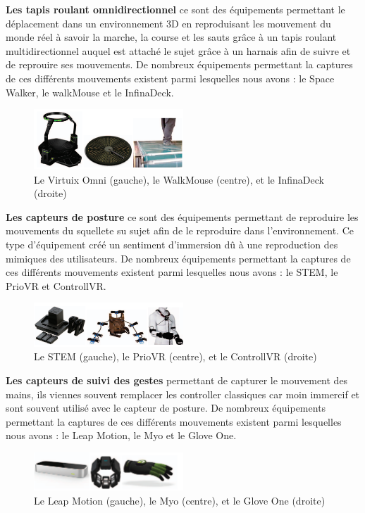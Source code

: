 \textbf{Les tapis roulant omnidirectionnel} ce sont des équipements permettant le déplacement dans un environnement 3D en reproduisant les mouvement du monde réel à savoir la marche, la course et les sauts grâce à un tapis roulant multidirectionnel auquel est attaché le sujet grâce à un harnais afin de suivre et de reprouire ses mouvements.
De nombreux équipements permettant la captures de ces différents mouvements existent parmi lesquelles nous avons : le Space Walker, le walkMouse et le InfinaDeck.

\begin{figure}[H]
	\centering
	\includegraphics[width=0.5\textwidth]{img/3dtap}
	\caption{Le Virtuix Omni (gauche), le WalkMouse (centre), et le InfinaDeck (droite)}
\end{figure}

\textbf{Les capteurs de posture} ce sont des équipements permettant de reproduire les mouvements du squellete su sujet afin de le reproduire dans l'environnement. Ce type d'équipement créé un sentiment d'immersion dû à une reproduction des mimiques des utilisateurs.
De nombreux équipements permettant la captures de ces différents mouvements existent parmi lesquelles nous avons : le STEM, le PrioVR et ControllVR.

\begin{figure}[H]
	\centering
	\includegraphics[width=0.5\textwidth]{img/3dcptt}
	\caption{Le STEM (gauche), le PrioVR (centre), et le ControllVR (droite)}
\end{figure}

\textbf{Les capteurs de suivi des gestes} permettant de capturer le mouvement des mains, ils viennes souvent remplacer les controller classiques car moin immercif et sont souvent utilisé avec le capteur de posture.
De nombreux équipements permettant la captures de ces différents mouvements existent parmi lesquelles nous avons : le Leap Motion, le Myo et le Glove One.

\begin{figure}[H]
	\centering
	\includegraphics[width=0.5\textwidth]{img/3dgan}
	\caption{Le Leap Motion (gauche), le Myo (centre), et le Glove One (droite)}
\end{figure}

